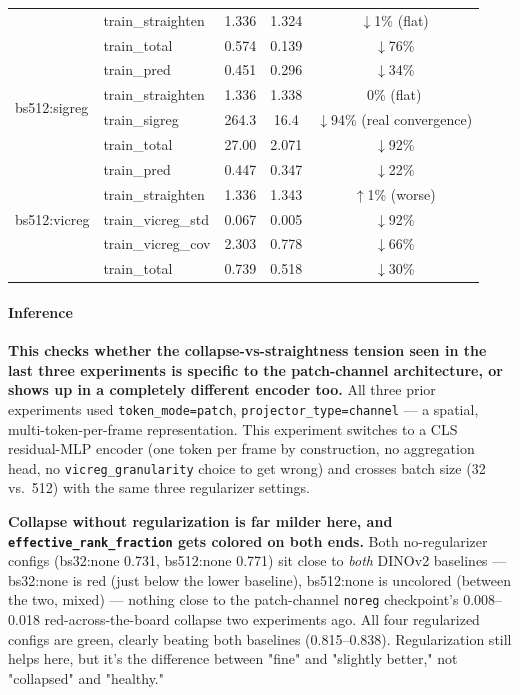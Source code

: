 \begin{table}[H]
\begin{tabular}{llccc}
 & train\_straighten & 1.336 & 1.324 & $\downarrow$1\% (flat) \\
 & train\_total & 0.574 & 0.139 & $\downarrow$76\% \\
\midrule
\multirow{4}{*}{bs512:sigreg}
 & train\_pred & 0.451 & 0.296 & $\downarrow$34\% \\
 & train\_straighten & 1.336 & 1.338 & 0\% (flat) \\
 & train\_sigreg & 264.3 & 16.4 & $\downarrow$94\% (real convergence) \\
 & train\_total & 27.00 & 2.071 & $\downarrow$92\% \\
\midrule
\multirow{5}{*}{bs512:vicreg}
 & train\_pred & 0.447 & 0.347 & $\downarrow$22\% \\
 & train\_straighten & 1.336 & 1.343 & $\uparrow$1\% (worse) \\
 & train\_vicreg\_std & 0.067 & 0.005 & $\downarrow$92\% \\
 & train\_vicreg\_cov & 2.303 & 0.778 & $\downarrow$66\% \\
 & train\_total & 0.739 & 0.518 & $\downarrow$30\% \\
\bottomrule
\end{tabular}
\end{table}

\paragraph{Inference}

\textbf{This checks whether the collapse-vs-straightness tension seen in the last three
experiments is specific to the patch-channel architecture, or shows up in a completely
different encoder too.} All three prior experiments used \texttt{token\_mode=patch},
\texttt{projector\_type=channel} --- a spatial, multi-token-per-frame representation.
This experiment switches to a CLS residual-MLP encoder (one token per frame by
construction, no aggregation head, no \texttt{vicreg\_granularity} choice to get wrong)
and crosses batch size (32 vs.\ 512) with the same three regularizer settings.

\textbf{Collapse without regularization is far milder here, and \texttt{effective\_rank\_fraction}
gets colored on both ends.} Both no-regularizer configs (bs32:none 0.731, bs512:none
0.771) sit close to \emph{both} DINOv2 baselines --- bs32:none is red (just below the
lower baseline), bs512:none is uncolored (between the two, mixed) --- nothing close to
the patch-channel \texttt{noreg} checkpoint's 0.008--0.018 red-across-the-board collapse
two experiments ago. All four regularized configs are green, clearly beating both
baselines (0.815--0.838). Regularization still helps here, but it's the difference
between "fine" and "slightly better," not "collapsed" and "healthy."

